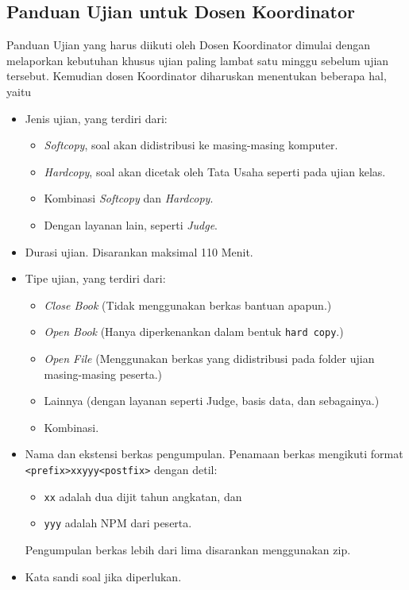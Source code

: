 \subsection{Panduan Ujian untuk Dosen Koordinator}
    Panduan Ujian yang harus diikuti oleh Dosen Koordinator dimulai dengan
    melaporkan kebutuhan khusus ujian paling lambat satu minggu sebelum ujian
    tersebut.  Kemudian dosen Koordinator diharuskan menentukan beberapa hal,
    yaitu
    \begin{itemize}
        \item Jenis ujian, yang terdiri dari: 
            \begin{itemize}
                \item \textit{Softcopy}, soal akan didistribusi ke
                    masing-masing komputer.
                \item \textit{Hardcopy}, soal akan dicetak oleh Tata Usaha seperti pada
                    ujian kelas.
                \item Kombinasi \textit{Softcopy} dan \textit{Hardcopy}.
                \item Dengan layanan lain, seperti \textit{Judge}.
            \end{itemize}
        \item Durasi ujian. Disarankan maksimal 110 Menit.
        \item Tipe ujian, yang terdiri dari:
            \begin{itemize}
                \item \textit{Close Book} (Tidak menggunakan berkas bantuan apapun.)
                \item \textit{Open Book} (Hanya diperkenankan dalam bentuk
                    \texttt{hard copy}.)
                \item \textit{Open File} (Menggunakan berkas yang didistribusi
                    pada folder ujian masing-masing peserta.)
                \item Lainnya (dengan layanan seperti Judge, basis data, dan sebagainya.)
                \item Kombinasi.
            \end{itemize}
        \item Nama dan ekstensi berkas pengumpulan. Penamaan berkas mengikuti
            format \texttt{<prefix>xxyyy<postfix>} dengan detil:
            \begin{itemize}
                \item \texttt{xx} adalah dua dijit tahun angkatan, dan
                \item \texttt{yyy} adalah NPM dari peserta.
            \end{itemize}
            Pengumpulan berkas lebih dari lima disarankan menggunakan zip.

        \item Kata sandi soal jika diperlukan.
    \end{itemize}

